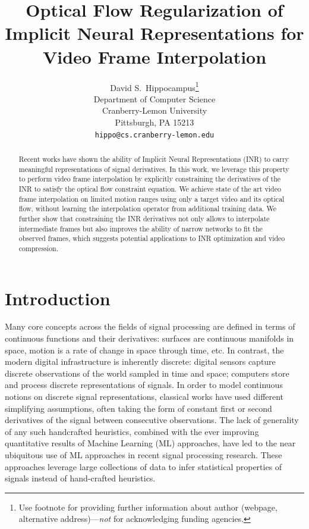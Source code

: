 \documentclass{article}
\title{Optical Flow Regularization of Implicit Neural Representations for Video Frame Interpolation}
\author{%
  David S.~Hippocampus\thanks{Use footnote for providing further information
    about author (webpage, alternative address)---\emph{not} for acknowledging
    funding agencies.} \\
  Department of Computer Science\\
  Cranberry-Lemon University\\
  Pittsburgh, PA 15213 \\
  \texttt{hippo@cs.cranberry-lemon.edu} \\
}
\begin{document}
\maketitle


\begin{abstract}
Recent works have shown the ability of Implicit Neural Representations (INR) to carry meaningful representations of signal derivatives.
In this work, we leverage this property to perform video frame interpolation
by explicitly constraining the derivatives of the INR to satisfy the optical flow constraint equation.
We achieve state of the art video frame interpolation on limited motion ranges
using only a target video and its optical flow, without learning the interpolation operator from additional training data.
We further show that constraining the INR derivatives not only
allows to interpolate intermediate frames but also improves the ability of narrow networks to fit the observed frames,
which suggests potential applications to INR optimization and video compression.
\end{abstract}

\section{Introduction}


Many core concepts across the fields of signal processing are defined in terms of continuous functions and their derivatives:
surfaces are continuous manifolds in space,
motion is a rate of change in space through time, etc.
In contrast, the modern digital infrastructure is inherently discrete:
digital sensors capture discrete observations of the world sampled in time and space;
computers store and process discrete representations of signals.
In order to model continuous notions on discrete signal representations,
classical works have used different simplifying assumptions,
often taking the form of constant first or second derivatives of the signal between consecutive observations.
The lack of generality of any such handcrafted heuristics,
combined with the ever improving quantitative results of Machine Learning (ML) approaches,
have led to the near ubiquitous use of ML approaches in recent signal processing research.
These approaches leverage large collections of data to infer statistical properties of signals instead of hand-crafted heuristics.
\end{document}
